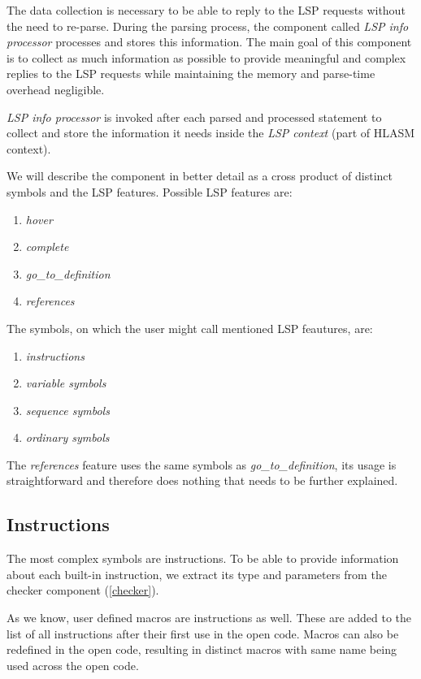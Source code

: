 The data collection is necessary to be able to reply to the LSP requests without the need to re-parse. During the parsing process, the component called \emph{LSP info processor} processes and stores this information. The main goal of this component is to collect as much information as possible to provide meaningful and complex replies to the LSP requests while maintaining the memory and parse-time overhead negligible.

\emph{LSP info processor} is invoked after each parsed and processed statement to collect and store the information it needs inside the \emph{LSP context} (part of HLASM context). 

We will describe the component in better detail as a cross product of distinct symbols and the LSP features. Possible LSP features are:
\begin{enumerate}
	\item \emph{hover}
	\item \emph{complete}
	\item \emph{go\_to\_definition}
	\item \emph{references}
\end{enumerate}
The symbols, on which the user might call mentioned LSP feautures, are:
\begin{enumerate}
	\item \emph{instructions}
	\item \emph{variable symbols}
	\item \emph{sequence symbols}
	\item \emph{ordinary symbols}
\end{enumerate}

The \emph{references} feature uses the same symbols as \emph{go\_to\_definition}, its usage is straightforward and therefore does nothing that needs to be further explained.

\subsection{Instructions}

The most complex symbols are instructions. To be able to provide information about each built-in instruction, we extract its type and parameters from the checker component (\cref{checker}).

As we know, user defined macros are instructions as well. These are added to the list of all instructions after their first use in the open code. Macros can also be redefined in the open code, resulting in distinct macros with same name being used across the open code.

